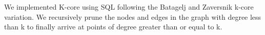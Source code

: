 We implemented K-core using SQL following the Batagelj and Zaversnik k-core variation. We recursively prune the nodes and edges in the graph with degree less than k to finally arrive at points of degree greater than or equal to k. 


